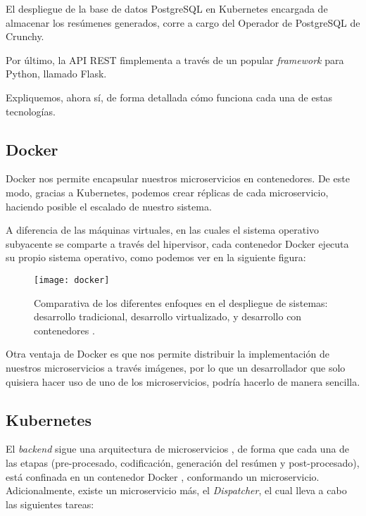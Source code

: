 El despliegue de la base de datos PostgreSQL en Kubernetes encargada de almacenar los resúmenes generados, corre a cargo del Operador de PostgreSQL de Crunchy.

Por último, la API REST fimplementa a través de un popular \emph{framework} para Python, llamado Flask.

Expliquemos, ahora sí, de forma detallada cómo funciona cada una de estas tecnologías.

\subsection{Docker}

Docker nos permite encapsular nuestros microservicios en contenedores. De este modo, gracias a Kubernetes, podemos crear réplicas de cada microservicio, haciendo posible el escalado de nuestro sistema.

A diferencia de las máquinas virtuales, en las cuales el sistema operativo subyacente se comparte a través del hipervisor, cada contenedor Docker ejecuta su propio sistema operativo, como podemos ver en la siguiente figura:

\begin{figure}[!h]
	\centering
	\texttt{[image: docker]}
	\caption[Diferentes enfoques en el despliegue de sistemas.]{Comparativa de los diferentes enfoques en el despliegue de sistemas: desarrollo tradicional, desarrollo virtualizado, y desarrollo con contenedores \cite{kubernetes}.}
	\label{fig:vm-container}
\end{figure}

Otra ventaja de Docker es que nos permite distribuir la implementación de nuestros microservicios a través imágenes, por lo que un desarrollador que solo quisiera hacer uso de uno de los microservicios, podría hacerlo de manera sencilla.

\subsection{Kubernetes}

El \emph{backend} sigue una arquitectura de microservicios \cite{newman15}, de forma que cada una de las etapas (pre-procesado, codificación, generación del resúmen y post-procesado), está confinada en un contenedor Docker \cite{docker}, conformando un microservicio. Adicionalmente, existe un microservicio más, el \emph{Dispatcher}, el cual lleva a cabo las siguientes tareas:

